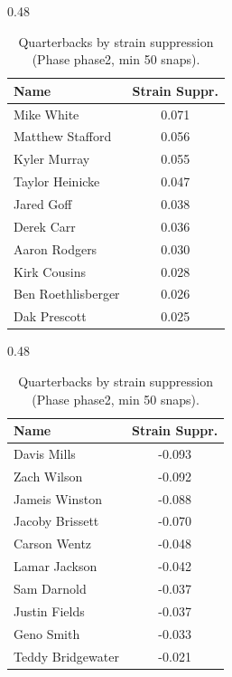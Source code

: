 \begin{table}[h!]
\centering
\begin{subtable}{0.48\textwidth}
\centering
\footnotesize
\begin{tabular}{lc}
\toprule
Name & Strain Suppr. \\
\midrule
Mike White & 0.071 \\
Matthew Stafford & 0.056 \\
Kyler Murray & 0.055 \\
Taylor Heinicke & 0.047 \\
Jared Goff & 0.038 \\
Derek Carr & 0.036 \\
Aaron Rodgers & 0.030 \\
Kirk Cousins & 0.028 \\
Ben Roethlisberger & 0.026 \\
Dak Prescott & 0.025 \\
\bottomrule
\end{tabular}
\caption{Most strain-suppressing}
\end{subtable}
\hfill
\begin{subtable}{0.48\textwidth}
\centering
\footnotesize
\begin{tabular}{lc}
\toprule
Name & Strain Suppr. \\
\midrule
Davis Mills & -0.093 \\
Zach Wilson & -0.092 \\
Jameis Winston & -0.088 \\
Jacoby Brissett & -0.070 \\
Carson Wentz & -0.048 \\
Lamar Jackson & -0.042 \\
Sam Darnold & -0.037 \\
Justin Fields & -0.037 \\
Geno Smith & -0.033 \\
Teddy Bridgewater & -0.021 \\
\bottomrule
\end{tabular}
\caption{Least strain-suppressing}
\end{subtable}
\hfill
\caption{Quarterbacks by strain suppression (Phase phase2, min 50 snaps).}
\label{tab:qb_supp_phase2}
\end{table}
